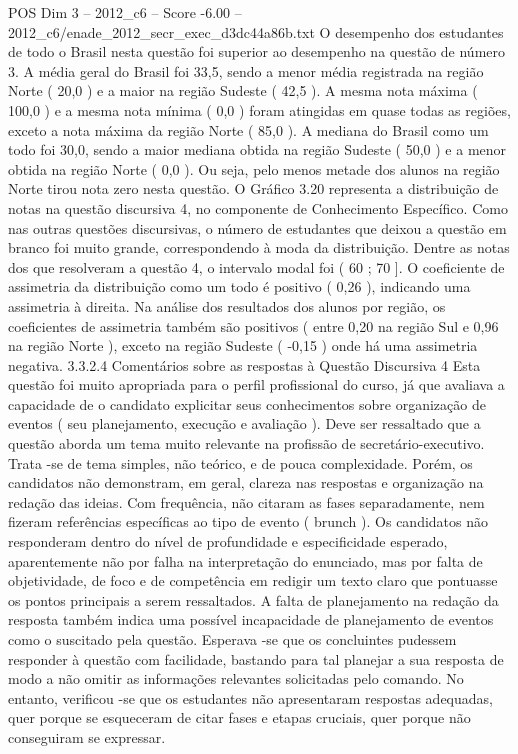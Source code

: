 \begin{textsample}{POS Dim 3 – 2012\_c6 – Score -6.00 – 2012\_c6/enade\_2012\_secr\_exec\_d3dc44a86b.txt}
O desempenho dos estudantes de todo o Brasil nesta questão foi superior ao desempenho na questão de número 3.
A média geral do Brasil foi 33,5, sendo a menor média registrada na região Norte ( 20,0 ) e a maior na região Sudeste ( 42,5 ).
A mesma nota máxima ( 100,0 ) e a mesma nota mínima ( 0,0 ) foram atingidas em quase todas as regiões, exceto a nota máxima da região Norte ( 85,0 ).
A mediana do Brasil como um todo foi 30,0, sendo a maior mediana obtida na região Sudeste ( 50,0 ) e a menor obtida na região Norte ( 0,0 ).
Ou seja, pelo menos metade dos alunos na região Norte tirou nota zero nesta questão.
O Gráfico 3.20 representa a distribuição de notas na questão discursiva 4, no componente de Conhecimento Específico.
Como nas outras questões discursivas, o número de estudantes que deixou a questão em branco foi muito grande, correspondendo à moda da distribuição.
Dentre as notas dos que resolveram a questão 4, o intervalo modal foi ( 60 ; 70 ].
O coeficiente de assimetria da distribuição como um todo é positivo ( 0,26 ), indicando uma assimetria à direita.
Na análise dos resultados dos alunos por região, os coeficientes de assimetria também são positivos ( entre 0,20 na região Sul e 0,96 na região Norte ), exceto na região Sudeste ( -0,15 ) onde há uma assimetria negativa. 3.3.2.4 Comentários sobre as respostas à Questão Discursiva 4 Esta questão foi muito apropriada para o perfil profissional do curso, já que avaliava a capacidade de o candidato explicitar seus conhecimentos sobre organização de eventos ( seu planejamento, execução e avaliação ).
Deve ser ressaltado que a questão aborda um tema muito relevante na profissão de secretário-executivo.
Trata -se de tema simples, não teórico, e de pouca complexidade.
Porém, os candidatos não demonstram, em geral, clareza nas respostas e organização na redação das ideias.
Com frequência, não citaram as fases separadamente, nem fizeram referências específicas ao tipo de evento ( brunch ).
Os candidatos não responderam dentro do nível de profundidade e especificidade esperado, aparentemente não por falha na interpretação do enunciado, mas por falta de objetividade, de foco e de competência em redigir um texto claro que pontuasse os pontos principais a serem ressaltados.
A falta de planejamento na redação da resposta também indica uma possível incapacidade de planejamento de eventos como o suscitado pela questão.
Esperava -se que os concluintes pudessem responder à questão com facilidade, bastando para tal planejar a sua resposta de modo a não omitir as informações relevantes solicitadas pelo comando.
No entanto, verificou -se que os estudantes não apresentaram respostas adequadas, quer porque se esqueceram de citar fases e etapas cruciais, quer porque não conseguiram se expressar.

\end{textsample}

